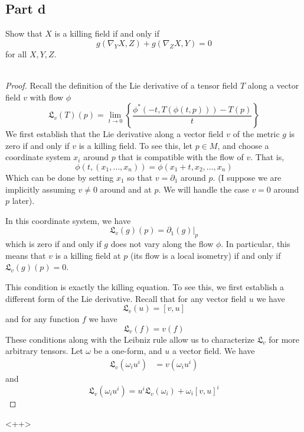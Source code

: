 \documentclass[fontsize=11pt]{scrartcl} %
\numberwithin{equation}{section} %
\numberwithin{figure}{section} %
\numberwithin{table}{section} %
\begin{document}
\subsection*{Part d}
Show that $X$ is a killing field if and only if
\[
    g(\nabla_YX,Z) + g(\nabla_ZX,Y)=0
\]
for all $X,Y,Z$. 
\\
\\
\begin{proof}
    Recall the definition of the Lie derivative of a tensor field $T$ along a
    vector field $v$ with flow $\phi$
    \[
        \mathfrak{L}_v(T)(p) = \lim_{t\to 0}\left\{
        \frac{\phi^*(-t,T(\phi(t,p)))-T(p)}{t} \right\}
    \]
    We first establish that the Lie derivative along a vector field $v$ of the
    metric $g$ is zero if and only if $v$ is a killing field.
    To see this, let $p\in M$, and choose a coordinate system $x_i$ around $p$
    that is compatible with the flow of $v$. That is, 
    \[
        \phi(t,(x_1,\dots,x_n)) = \phi(x_1+t,x_2,\dots,x_n)
    \]
    Which can be done by setting $x_1$ so that $v = \partial_1$ around $p$. (I
        suppose we are implicitly assuming $v\neq 0$ around and at $p$. We will
    handle the case $v=0$ around $p$ later).
    
    In this coordinate system, we have
    \[
        \mathfrak{L}_v(g)(p) = \partial_1(g)|_p
    \]
    which is zero if and only if $g$ does not vary along the flow $\phi$. In
    particular, this means that $v$ is a killing field at $p$ (its flow is a
    local isometry) if and only if $\mathfrak{L}_v(g)(p) = 0$.

    This condition is exactly the killing equation. To see this, we first
    establish a different form of the Lie derivative. Recall that for any vector
    field $u$ we have
    \[
        \mathfrak{L}_v(u) = [v,u]
    \]
    and for any function $f$ we have
    \[
        \mathfrak{L}_v(f) = v(f)
    \]
    These conditions along with the Leibniz rule allow us to characterize
    $\mathfrak{L}_v$ for more arbitrary tensors. Let $\omega$ be a one-form, and
    $u$ a vector field. We have
    \[
\begin{aligned}
    \mathfrak{L}_v(\omega_iu^i) &= v(\omega_iu^i)
\end{aligned}
    \]
    and
    \[
        \mathfrak{L}_v(\omega_iu^i) = u^i\mathfrak{L}_v(\omega_i) +
        \omega_i[v,u]^i
    \]
\end{proof}<++>
\end{document}
